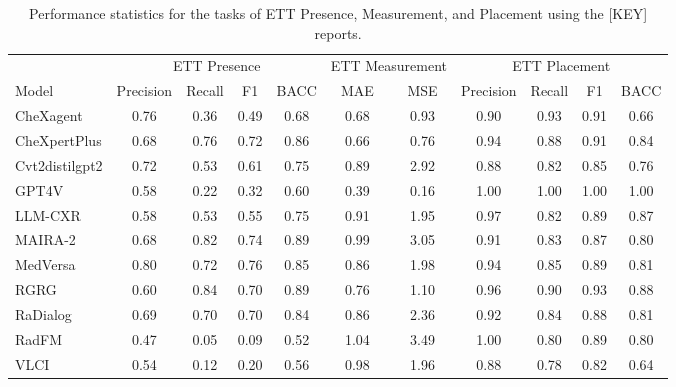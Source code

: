 
    \begin{table*}[htbp]
        \centering
        \small
        \caption{Performance statistics for the tasks of ETT Presence, Measurement, and Placement using the [KEY] reports.}
        \begin{tabular}{lcccccccccc}
        \toprule
        & \multicolumn{4}{c}{ETT Presence} & \multicolumn{2}{c}{ETT Measurement} & \multicolumn{4}{c}{ETT Placement} \\
        \cmidrule(lr){2-5}\cmidrule(lr){6-7}\cmidrule(lr){8-11}
        Model & Precision & Recall & F1 & BACC & MAE & MSE & Precision & Recall & F1 & BACC \\
        \midrule
    CheXagent & 0.76 & 0.36 & 0.49 & 0.68 & 0.68 & 0.93 & 0.90 & 0.93 & 0.91 & 0.66 \\
CheXpertPlus & 0.68 & 0.76 & 0.72 & 0.86 & 0.66 & 0.76 & 0.94 & 0.88 & 0.91 & 0.84 \\
Cvt2distilgpt2 & 0.72 & 0.53 & 0.61 & 0.75 & 0.89 & 2.92 & 0.88 & 0.82 & 0.85 & 0.76 \\
GPT4V & 0.58 & 0.22 & 0.32 & 0.60 & 0.39 & 0.16 & 1.00 & 1.00 & 1.00 & 1.00 \\
LLM-CXR & 0.58 & 0.53 & 0.55 & 0.75 & 0.91 & 1.95 & 0.97 & 0.82 & 0.89 & 0.87 \\
MAIRA-2 & 0.68 & 0.82 & 0.74 & 0.89 & 0.99 & 3.05 & 0.91 & 0.83 & 0.87 & 0.80 \\
MedVersa & 0.80 & 0.72 & 0.76 & 0.85 & 0.86 & 1.98 & 0.94 & 0.85 & 0.89 & 0.81 \\
RGRG & 0.60 & 0.84 & 0.70 & 0.89 & 0.76 & 1.10 & 0.96 & 0.90 & 0.93 & 0.88 \\
RaDialog & 0.69 & 0.70 & 0.70 & 0.84 & 0.86 & 2.36 & 0.92 & 0.84 & 0.88 & 0.81 \\
RadFM & 0.47 & 0.05 & 0.09 & 0.52 & 1.04 & 3.49 & 1.00 & 0.80 & 0.89 & 0.80 \\
VLCI & 0.54 & 0.12 & 0.20 & 0.56 & 0.98 & 1.96 & 0.88 & 0.78 & 0.82 & 0.64 \\

        \bottomrule
        \end{tabular}
        \label{tab:ett_metrics_KEY}
    \end{table*}
    